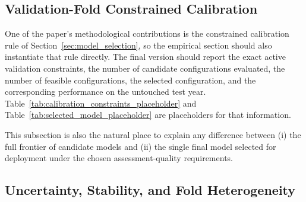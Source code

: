 \documentclass[12pt, draft]{article}
\theoremstyle{plain}
\theoremstyle{definition}
\newcommand{\1}{\mathbf{1}}
\begin{document}
\subsection{Validation-Fold Constrained Calibration}

One of the paper's methodological contributions is the constrained calibration rule of Section~\ref{sec:model_selection}, so the empirical section should also instantiate that rule directly. The final version should report the exact active validation constraints, the number of candidate configurations evaluated, the number of feasible configurations, the selected configuration, and the corresponding performance on the untouched test year. Table~\ref{tab:calibration_constraints_placeholder} and Table~\ref{tab:selected_model_placeholder} are placeholders for that information.

\begin{table}[t]
\centering
\caption{Placeholder for the exact empirical calibration rule used on validation folds.}
\label{tab:calibration_constraints_placeholder}
\end{table}

\begin{table}[t]
\centering
\caption{Placeholder for the final selected configuration under constrained calibration.}
\label{tab:selected_model_placeholder}
\end{table}

This subsection is also the natural place to explain any difference between (i) the full frontier of candidate models and (ii) the single final model selected for deployment under the chosen assessment-quality requirements.

\subsection{Uncertainty, Stability, and Fold Heterogeneity}
\end{document}
